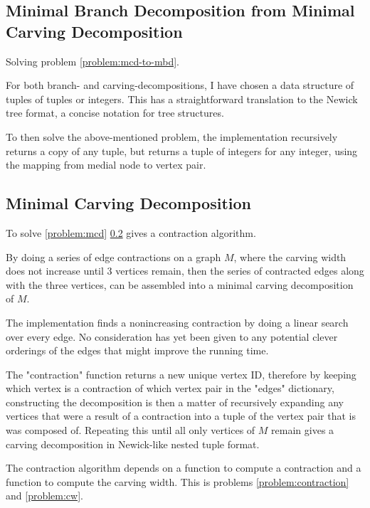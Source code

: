 \documentclass{article}
\begin{document}
	
	\subsection{Minimal Branch Decomposition from Minimal Carving Decomposition}

		Solving problem \ref{problem:mcd-to-mbd}.

		For both branch- and carving-decompositions, I have chosen a data structure of tuples of tuples or integers. This has a straightforward translation to the Newick tree format, a concise notation for tree structures.

		To then solve the above-mentioned problem, the implementation recursively returns a copy of any tuple, but returns a tuple of integers for any integer, using the mapping from medial node to vertex pair.

			
	\subsection{Minimal Carving Decomposition}

		To solve \ref{problem:mcd} \ref{} gives a contraction algorithm.

		By doing a series of edge contractions on a graph $M$, where the carving width does not increase until 3 vertices remain, then the series of contracted edges along with the three vertices, can be assembled into a minimal carving decomposition of $M$.

		The implementation finds a nonincreasing contraction by doing a linear search over every edge. No consideration has yet been given to any potential clever orderings of the edges that might improve the running time.

		The "contraction" function returns a new unique vertex ID, therefore by keeping which vertex is a contraction of which vertex pair in the "edges" dictionary, constructing the decomposition is then a matter of recursively expanding any vertices that were a result of a contraction into a tuple of the vertex pair that is was composed of. Repeating this until all only vertices of $M$ remain gives a carving decomposition in Newick-like nested tuple format.


		The contraction algorithm depends on a function to compute a contraction and a function to compute the carving width. This is problems \ref{problem:contraction} and \ref{problem:cw}.
\end{document}
